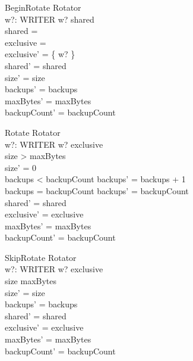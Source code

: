 \documentclass{article}
\begin{document}
\begin{schema}{BeginRotate}
  \Delta Rotator \\
  w?: WRITER
\where
  w? \notin shared \\
  shared = \emptyset \\
  exclusive = \emptyset \\
  exclusive' = \{ w? \} \\
  shared' = shared \\
  size' = size \\
  backups' = backups \\
  maxBytes' = maxBytes \\
  backupCount' = backupCount
\end{schema}

\begin{schema}{Rotate}
  \Delta Rotator \\
  w?: WRITER
\where
  w? \in exclusive \\
  size > maxBytes \\
  size' = 0 \\
  backups < backupCount \implies backups' = backups + 1 \\
  backups = backupCount \implies backups' = backupCount \\
  shared' = shared \\
  exclusive' = exclusive \\
  maxBytes' = maxBytes \\
  backupCount' = backupCount
\end{schema}

\begin{schema}{SkipRotate}
  \Delta Rotator \\
  w?: WRITER
\where
  w? \in exclusive \\
  size \leq maxBytes \\
  size' = size \\
  backups' = backups \\
  shared' = shared \\
  exclusive' = exclusive \\
  maxBytes' = maxBytes \\
  backupCount' = backupCount
\end{schema}
\end{document}
